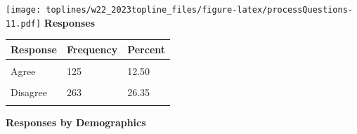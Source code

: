 \documentclass[]{article}
\begin{document}
\texttt{[image: toplines/w22\_2023topline\_files/figure-latex/processQuestions-11.pdf]}
\textbf{Responses}

\begin{tabu} to 
\toprule
Response & Frequency & Percent\\
\midrule
{} &  & \\
Agree & 125 & 12.50\\
 &  & \\
Disagree & 263 & 26.35\\
 &  & \\
\bottomrule
\end{tabu}

\textbf{Responses by Demographics}\begingroup\fontsize{7}{9}\selectfont
\end{document}

